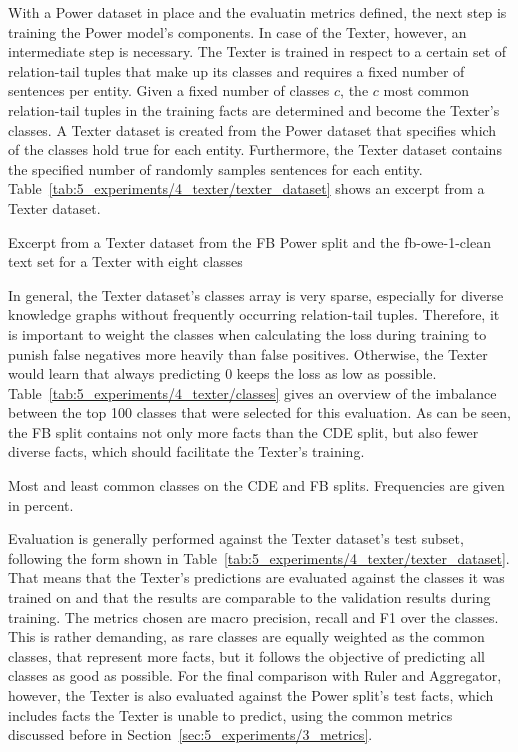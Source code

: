With a Power dataset in place and the evaluatin metrics defined, the next step is training the Power model's components. In case of the Texter, however, an intermediate step is necessary. The Texter is trained in respect to a certain set of relation-tail tuples that make up its classes and requires a fixed number of sentences per entity. Given a fixed number of classes $c$, the $c$ most common relation-tail tuples in the training facts are determined and become the Texter's classes. A Texter dataset is created from the Power dataset that specifies which of the classes hold true for each entity. Furthermore, the Texter dataset contains the specified number of randomly samples sentences for each entity. Table~\ref{tab:5_experiments/4_texter/texter_dataset} shows an excerpt from a Texter dataset.

\begin{table}[h]
    \centering
    
    \caption{Excerpt from a Texter dataset from the FB Power split and the fb-owe-1-clean text set for a Texter with eight classes}
    \label{tab:5_experiments/4_texter/texter_dataset}
\end{table}

In general, the Texter dataset's classes array is very sparse, especially for diverse knowledge graphs without frequently occurring relation-tail tuples. Therefore, it is important to weight the classes when calculating the loss during training to punish false negatives more heavily than false positives. Otherwise, the Texter would learn that always predicting 0 keeps the loss as low as possible. Table~\ref{tab:5_experiments/4_texter/classes} gives an overview of the imbalance between the top 100 classes that were selected for this evaluation. As can be seen, the FB split contains not only more facts than the CDE split, but also fewer diverse facts, which should facilitate the Texter's training.

\begin{table}[h]
    \centering
    
    \caption{Most and least common classes on the CDE and FB splits. Frequencies are given in percent.}
    \label{tab:5_experiments/4_texter/classes}
\end{table}

Evaluation is generally performed against the Texter dataset's test subset, following the form shown in Table~\ref{tab:5_experiments/4_texter/texter_dataset}. That means that the Texter's predictions are evaluated against the classes it was trained on and that the results are comparable to the validation results during training. The metrics chosen are macro precision, recall and F1 over the classes. This is rather demanding, as rare classes are equally weighted as the common classes, that represent more facts, but it follows the objective of predicting all classes as good as possible. For the final comparison with Ruler and Aggregator, however, the Texter is also evaluated against the Power split's test facts, which includes facts the Texter is unable to predict, using the common metrics discussed before in Section~\ref{sec:5_experiments/3_metrics}.

